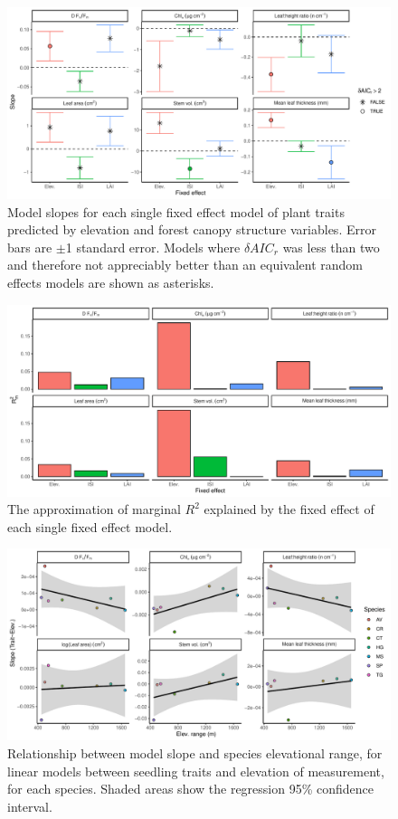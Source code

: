 \documentclass[a4paper, 11pt]{article}
\begin{document}
\begin{figure}[H]
\includegraphics[width=\textwidth]{single_pred_slope}
\centering
\caption{Model slopes for each single fixed effect model of plant traits predicted by elevation and forest canopy structure variables. Error bars are $\pm$1 standard error. Models where $\delta{}AIC_r$ was less than two and therefore not appreciably better than an equivalent random effects models are shown as asterisks.}
\label{single_pred_slope}
\end{figure}

\begin{figure}[H]
\includegraphics[width=\textwidth]{single_pred_r2m}
\centering
\caption{The approximation of marginal $R^2$ explained by the fixed effect of each single fixed effect model.}
\label{single_pred_r2m}
\end{figure}

\begin{figure}[H]
\includegraphics[width=\textwidth]{slope_elev_scatter}
\centering
\caption{Relationship between model slope and species elevational range, for linear models between seedling traits and elevation of measurement, for each species. Shaded areas show the regression 95\% confidence interval.}
\label{slope_elev_scatter}
\end{figure}
\end{document}
